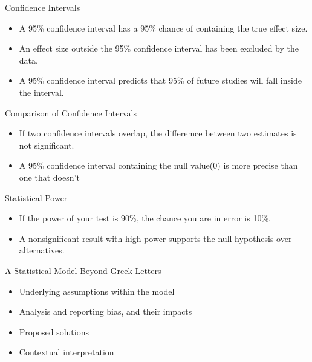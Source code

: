 \documentclass[aspectratio=169, 12pt]{beamer}
\begin{document}
\begin{frame}{Confidence Intervals} %
\begin{itemize}
    \item A 95\% confidence interval has a 95\% chance of containing the true effect size.
    \vspace{0.5cm}
    \item An effect size outside the 95\% confidence interval has been excluded by the data.
    \vspace{0.5cm}
    \item A 95\% confidence interval predicts that 95\% of future studies will fall inside the interval.
\end{itemize}
\end{frame}

\begin{frame}{Comparison of Confidence Intervals} %
\begin{itemize}
    \item If two confidence intervals overlap, the differemce between two estimates is not significant.
    \vspace{0.5cm}
    \item A 95\% confidence interval containing the null value(0) is more precise than one that doesn't
\end{itemize}
\end{frame}

\begin{frame}{Statistical Power} %
\begin{itemize}
    \item If the power of your test is 90\%, the chance you are in error is 10\%.
    \vspace{0.5cm}
    \item A nonsignificant result with high power supports the null hypothesis over alternatives.
\end{itemize}
\end{frame}

\begin{frame}{A Statistical Model Beyond Greek Letters}
\begin{itemize}
    \item Underlying assumptions within the model
    \vspace{0.5cm}
    \item Analysis and reporting bias, and their impacts
    \vspace{0.5cm}
    \item Proposed solutions
    \vspace{0.5cm}
    \item Contextual interpretation
\end{itemize}
\end{frame}
\end{document}
